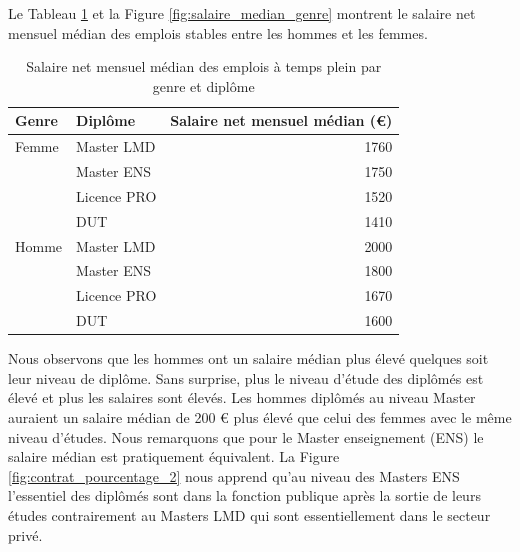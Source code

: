 \documentclass[12pt, a4paper, titlepage, table]{article}
\begin{document}
	Le Tableau \ref{tab:salaire_median_genre} et la Figure \ref{fig:salaire_median_genre} montrent le salaire net mensuel médian des emplois stables entre les hommes et les femmes. 

	\begin{table}[H]
		\centering
		\begin{tabular}{llr}
			\toprule
			\textbf{Genre} & \textbf{Diplôme} & \textbf{{Salaire net mensuel médian (€)}} \\
			\midrule
			Femme & Master LMD & 1760 \\
			& Master ENS & 1750 \\
			& Licence PRO & 1520 \\
			& DUT & 1410 \\
			\midrule
			Homme & Master LMD & 2000 \\
			& Master ENS & 1800 \\
			& Licence PRO & 1670 \\
			& DUT & 1600 \\
			\bottomrule
		\end{tabular}
		\caption{Salaire net mensuel médian des emplois à temps plein par genre et diplôme}
		\label{tab:salaire_median_genre}
	\end{table}
	
	Nous observons que les hommes ont un salaire médian plus élevé quelques soit leur niveau de diplôme.
	Sans surprise, plus le niveau d'étude des diplômés est élevé et plus les salaires sont élevés.
	Les hommes diplômés au niveau Master auraient un salaire médian de 200 € plus élevé que celui des femmes avec le même niveau d'études.
	Nous remarquons que pour le Master enseignement (ENS) le salaire médian est pratiquement équivalent.  
	La Figure \ref{fig:contrat_pourcentage_2} nous apprend qu'au niveau des Masters ENS l'essentiel des diplômés sont dans la fonction publique après la sortie de leurs études contrairement au Masters LMD qui sont essentiellement dans le secteur privé.
		
\end{document}
